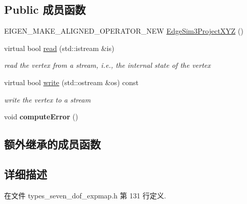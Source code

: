 \subsection*{Public 成员函数}
\begin{DoxyCompactItemize}
\item 
E\-I\-G\-E\-N\-\_\-\-M\-A\-K\-E\-\_\-\-A\-L\-I\-G\-N\-E\-D\-\_\-\-O\-P\-E\-R\-A\-T\-O\-R\-\_\-\-N\-E\-W \hyperlink{classg2o_1_1EdgeSim3ProjectXYZ_a97beb2afff3d5b8bb6d19dccd032da14}{Edge\-Sim3\-Project\-X\-Y\-Z} ()
\item 
\hypertarget{classg2o_1_1EdgeSim3ProjectXYZ_aaf72b3f12f99f131e6c3395baf796fe9}{virtual bool \hyperlink{classg2o_1_1EdgeSim3ProjectXYZ_aaf72b3f12f99f131e6c3395baf796fe9}{read} (std\-::istream \&is)}\label{classg2o_1_1EdgeSim3ProjectXYZ_aaf72b3f12f99f131e6c3395baf796fe9}

\begin{DoxyCompactList}\small\item\em read the vertex from a stream, i.\-e., the internal state of the vertex \end{DoxyCompactList}\item 
\hypertarget{classg2o_1_1EdgeSim3ProjectXYZ_ad29bc1412dd5141b9ff9b5bb7363db4c}{virtual bool \hyperlink{classg2o_1_1EdgeSim3ProjectXYZ_ad29bc1412dd5141b9ff9b5bb7363db4c}{write} (std\-::ostream \&os) const }\label{classg2o_1_1EdgeSim3ProjectXYZ_ad29bc1412dd5141b9ff9b5bb7363db4c}

\begin{DoxyCompactList}\small\item\em write the vertex to a stream \end{DoxyCompactList}\item 
\hypertarget{classg2o_1_1EdgeSim3ProjectXYZ_ae821156265db463d49b9ac2166186274}{void {\bfseries compute\-Error} ()}\label{classg2o_1_1EdgeSim3ProjectXYZ_ae821156265db463d49b9ac2166186274}

\end{DoxyCompactItemize}
\subsection*{额外继承的成员函数}


\subsection{详细描述}


在文件 types\-\_\-seven\-\_\-dof\-\_\-expmap.\-h 第 131 行定义.



